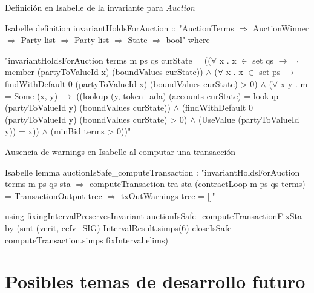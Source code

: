 \documentclass{beamer}
\begin{document}
\begin{frame}[fragile]{Definición en Isabelle de la invariante para \textit{Auction}}
\begin{code}{Isabelle}
definition invariantHoldsForAuction :: "AuctionTerms $\Rightarrow$ AuctionWinner $\Rightarrow$ Party list $\Rightarrow$ Party list $\Rightarrow$ State $\Rightarrow$ bool" where

"invariantHoldsForAuction terms m ps qs curState =
       (($\forall$ x . x $\in$ set qs $\longrightarrow$
                $\neg$ member (partyToValueId x) (boundValues curState))
     $\land$ ($\forall$ x . x $\in$ set ps $\longrightarrow$ 
                findWithDefault 0 (partyToValueId x) (boundValues curState) > 0)
     $\land$ ($\forall$ x y . m = Some (x, y) $\longrightarrow$ 
              ((lookup (y, token_ada) (accounts curState) = 
                lookup (partyToValueId y) (boundValues curState))
             $\land$ (findWithDefault 0 (partyToValueId y) (boundValues curState) > 0) 
             $\land$ (UseValue (partyToValueId y)) = x))
     $\land$ (minBid terms > 0))"
\end{code}


\end{frame}

\begin{frame}[fragile]{Ausencia de warnings en Isabelle al computar una transacción}
\begin{code}{Isabelle}
lemma auctionIsSafe_computeTransaction :
    "invariantHoldsForAuction terms m ps qs sta $\Longrightarrow$
     computeTransaction tra sta (contractLoop m ps qs terms) =
       TransactionOutput trec $\Longrightarrow$ txOutWarnings trec = []"

  using fixingIntervalPreservesInvariant auctionIsSafe_computeTransactionFixSta
  by (smt (verit, ccfv_SIG) IntervalResult.simps(6) closeIsSafe computeTransaction.simps fixInterval.elims)
\end{code}

\end{frame}

\section{Posibles temas de desarrollo futuro}
\end{document}
